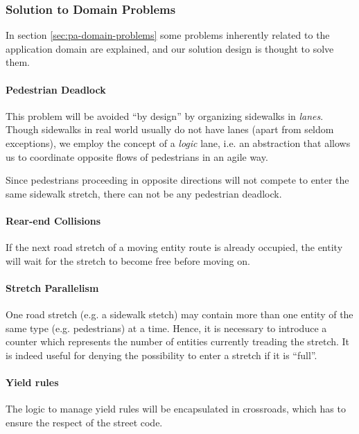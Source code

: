 \subsubsection{Solution to Domain Problems}

In section \ref{sec:pa-domain-problems} some problems 
inherently related to the application domain are explained, 
and our solution design is thought to solve them.

\paragraph{Pedestrian Deadlock}
This problem will be avoided ``by design'' by organizing sidewalks in
\textit{lanes}. Though sidewalks in real world usually do not have lanes (apart
from seldom exceptions), we employ the concept of a \textit{logic} lane, i.e.
an abstraction that allows us to coordinate opposite flows of pedestrians in an
agile way.

Since pedestrians proceeding in opposite directions will not compete to enter
the same sidewalk stretch, there can not be any pedestrian deadlock.

\paragraph{Rear-end Collisions} 
If the next road stretch of a moving entity route is already occupied,
the entity will wait for the stretch to become free before moving on.

\paragraph{Stretch Parallelism} 
One road stretch (e.g. a sidewalk stetch) may contain more 
than one entity of the same type (e.g. pedestrians) at a time.
Hence, it is necessary to introduce a counter which represents
the number of entities currently treading the stretch.
It is indeed useful for denying the possibility to enter a stretch if it is ``full''.

\paragraph{Yield rules} 
The logic to manage yield rules will be encapsulated in crossroads, 
which has to ensure the respect of the street code.
